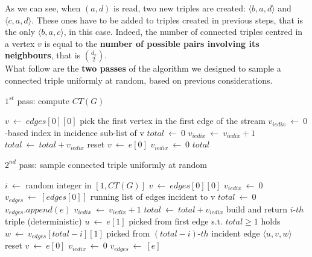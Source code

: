 \noindent As we can see, when $(a,d)$ is read, two new triples are created: $\langle b,a,d\rangle$ and $\langle c,a,d\rangle$. These ones have to be added to triples created in previous steps, that is the only $\langle b,a,c\rangle$, in this case. Indeed, the number of connected triples centred in a vertex $v$ is equal to the \textbf{number of possible pairs involving its neighbours}, that is $\binom{d_v}{2}$.\\
What follow are the \textbf{two passes} of the algorithm we designed to sample a connected triple uniformly at random, based on previous considerations.
\medskip
\begin{algorithm}
	\caption{$1^{st}$ pass: compute $CT(G)$}
	\begin{algorithmic}[1]
		\State $v \ \leftarrow \ edges[0][0]$ \Comment pick the first vertex in the first edge of the stream
		\State $v_{iedix} \ \leftarrow \ 0$ -based index in incidence sub-list of v
		\State $total \ \leftarrow \ 0$
				\State $v_{iedix} \ \leftarrow \ v_{iedix} + 1$
				\State $total \ \leftarrow \ total + v_{iedix}$
			\Else \Comment reset
				\State $v \ \leftarrow \ e[0]$
				\State $v_{iedix} \ \leftarrow \ 0$
			\EndIf
		\EndFor
		\State \Return $total$
	\end{algorithmic}
\end{algorithm}


\begin{algorithm}
	\caption{$2^{nd}$ pass: sample connected triple uniformly at random}
	\begin{algorithmic}[1]
		\State $i \ \leftarrow$ random integer in $[1, CT(G)]$
		\State $v \ \leftarrow \ edges[0][0]$
		\State $v_{iedix} \ \leftarrow \ 0$
		\State $v_{edges} \ \leftarrow \ [edges[0]]$ \Comment running list of edges incident to v
		\State $total \ \leftarrow \ 0$
				\State $v_{edges}.append(e)$
				\State $v_{iedix} \ \leftarrow \ v_{iedix} + 1$
				\State $total \ \leftarrow \ total + v_{iedix}$
				 \Comment build and return $i\text{-}th$ triple (deterministic)
					\State $u \ \leftarrow \ e[1]$ \Comment picked from first edge s.t. $total \ge 1$ holds
					\State $w \ \leftarrow \ v_{edges}[total-i][1]$ \Comment picked from $(total-i)\text{-}th$ incident edge
					\State \Return $\langle u,v,w \rangle$
				\EndIf
			\Else \Comment reset
				\State $v \ \leftarrow \ e[0]$
				\State $v_{iedix} \ \leftarrow \ 0$
				\State $v_{edges} \ \leftarrow \ [e]$
			\EndIf
		\EndFor
	\end{algorithmic}
\end{algorithm}




